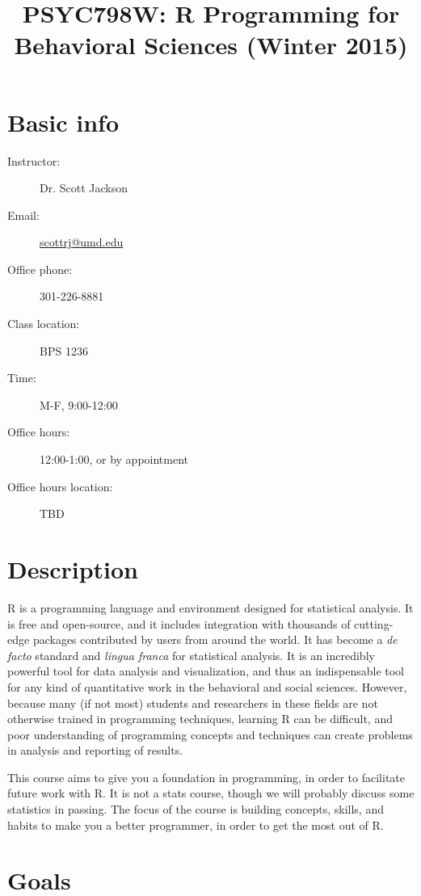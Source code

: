 \documentclass{tufte-handout}
\title{PSYC798W: R Programming for Behavioral Sciences (Winter 2015)}
\author{}
\date{}
\begin{document}
\maketitle


\section*{Basic info}
\label{sec-1}

\begin{description}
\item[Instructor:] Dr. Scott Jackson
\item[Email:] \href{mailto:scottrj@umd.edu}{scottrj@umd.edu}
\item[Office phone:] 301-226-8881
\item[Class location:] BPS 1236
\item[Time:] M-F, 9:00-12:00
\item[Office hours:] 12:00-1:00, or by appointment
\item[Office hours location:] TBD
\end{description}
\section*{Description}
\label{sec-2}

R is a programming language and environment designed for statistical analysis. It is free and open-source, and it includes integration with thousands of cutting-edge packages contributed by users from around the world. It has become a \emph{de facto} standard and \emph{lingua franca} for statistical analysis.  It is an incredibly powerful tool for data analysis and visualization, and thus an indispensable tool for any kind of quantitative work in the behavioral and social sciences. However, because many (if not most) students and researchers in these fields are not otherwise trained in programming techniques, learning R can be difficult, and poor understanding of programming concepts and techniques can create problems in analysis and reporting of results. 

This course aims to give you a foundation in programming, in order to facilitate future work with R.  It is not a stats course, though we will probably discuss some statistics in passing.  The focus of the course is building concepts, skills, and habits to make you a better programmer, in order to get the most out of R.
\section*{Goals}
\label{sec-3}
\end{document}
